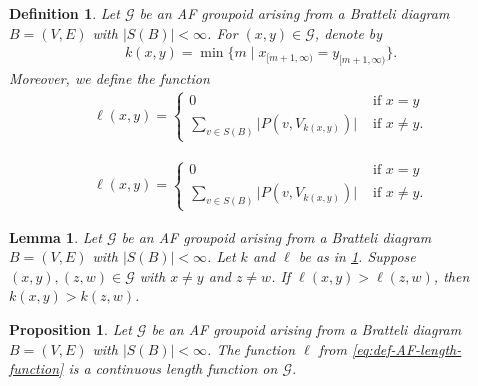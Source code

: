 \documentclass[10pt,a4paper]{amsart}
\newtheorem{definition}{Definition}
\newtheorem{lemma}{Lemma}
\newtheorem{proposition}{Proposition}
\newcommand{\G}{\mathcal{G}}
\begin{document}
	\begin{definition}\label{def:AF-length-function} 
	Let $\G$ be an AF groupoid arising from a Bratteli diagram $B = (V,E)$ with $\vert S(B)\vert < \infty$. 
	For $(x,y) \in \G$, denote by 
	\begin{align*}
		k(x,y) = \min \{m \mid x_{[m+1,\infty)} = y_{[m+1,\infty)}\}.
	\end{align*}
	 Moreover, we define the function
	\begin{align}\label{eq:def-AF-length-function}
		\ell(x,y) = \begin{cases}
			0 & \text{ if  $x=y$} \\ 
			\sum_{v \in S(B)} \vert P(v, V_{k(x,y)}) \vert & \text{ if $x \neq y$}.
		\end{cases}
	\end{align}
\end{definition}

	\begin{align}
		\ell(x,y) = \begin{cases}
			0 & \text{ if  $x=y$} \\ 
			\sum_{v \in S(B)} \vert P(v, V_{k(x,y)}) \vert & \text{ if $x \neq y$}.
		\end{cases}
	\end{align}

	\begin{lemma}\label{lemma:relating-ell-and-k}
		Let $\G$ be an AF groupoid arising from a Bratteli diagram $B = (V,E)$ with $\vert S(B)\vert < \infty$. 
		Let $k$ and $\ell$ be as in \cref{def:AF-length-function}. 
		Suppose $(x,y), (z,w) \in \G$ with $x\neq y$ and $z\neq w$. If $\ell(x,y) > \ell(z,w)$, then $k(x,y) > k(z,w)$. 
	\end{lemma}

	\begin{proposition}\label{prop:ellB-is-cont-length-function}
		Let $\G$ be an AF groupoid arising from a Bratteli diagram $B = (V,E)$ with $\vert S(B)\vert < \infty$.  
		The function $\ell$ from \eqref{eq:def-AF-length-function} 
		is a continuous length function on 
		$\G$.  
	\end{proposition}
\end{document}
